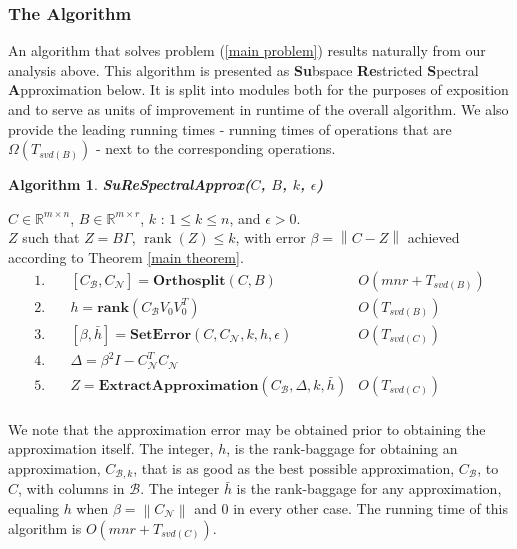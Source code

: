 \documentclass[11pt]{article}
\newcommand{\rank}{\operatorname{rank}}
\newtheorem{alg}{Algorithm}
\def\reals{\mathbb{R}}
\newcommand{\norm}[1]{\left\|#1\right\|}
\newcommand{\B}{\mathcal{B}}
\newcommand{\N}{\mathcal{N}}
\newcommand{\G}{\Gamma}
\newcommand{\0}{\ensuremath{\mathbf{0}}}
\renewcommand{\>}{\succ}
\newcommand{\<}{\prec}
\begin{document}
\subsubsection{The Algorithm}
An algorithm that solves problem (\ref{main problem}) results naturally from our analysis above. This algorithm is presented as \textbf{Su}bspace \textbf{Re}stricted \textbf{S}pectral \textbf{A}pproximation below. It is split into modules both for the purposes of exposition and to serve as units of improvement in runtime of the overall algorithm. We also provide the leading running times - running times of operations that are $\Omega(T_{svd(B)})$ - next to the corresponding operations.
\begin{framed}
\begin{alg}\label{alg:outline}
{\bf SuReSpectralApprox($C$, $B$, $k$, $\epsilon$) }
\end{alg}
 $C \in \reals^{m \times n}$, $B \in \reals^{m \times r}$, $k$ : $1 \leq k \leq n$, and $\epsilon > 0$.\\
 $Z$ such that $Z=B \G$, $\rank(Z) \leq k$, with error $\beta = \norm{C - Z}$ achieved according to Theorem \ref{main theorem}.
%
\begin{align*}
1. \quad& [C_{\B}, C_{\N}] = \textbf{Orthosplit}(C, B) & O(mnr + T_{svd(B)})\\
2. \quad& h = \textbf{rank}(C_{\B} V_0 V_0 ^T)  & O\left(T_{svd(B)} \right)\\
3. \quad& [\beta,\bar h] = \textbf{SetError}(C, C_{\N}, k, h, \epsilon) & O\left( T_{svd(C)} \right) \\
4. \quad& \Delta = \beta^2 I - C_{\N} ^T C_{\N} & \\
5. \quad& Z = \textbf{ExtractApproximation}(C_{\B}, \Delta, k, \bar h) & O\left( T_{svd(C)} \right) \\
\end{align*}
%
\end{framed}

\noindent We note that the approximation error may be obtained prior to obtaining the approximation itself. The integer, $h$, is the rank-baggage for obtaining an approximation, $C_{\B, k}$, that is as good as the best possible approximation, $C_{\B}$, to $C$, with columns in $\B$. The integer $\bar{h}$ is the rank-baggage for any approximation, equaling $h$ when $\beta = \norm{C_{\N}}$ and 0 in every other case. The running time of this algorithm is $O\left( mnr + T_{svd(C)} \right)$.
\end{document}
